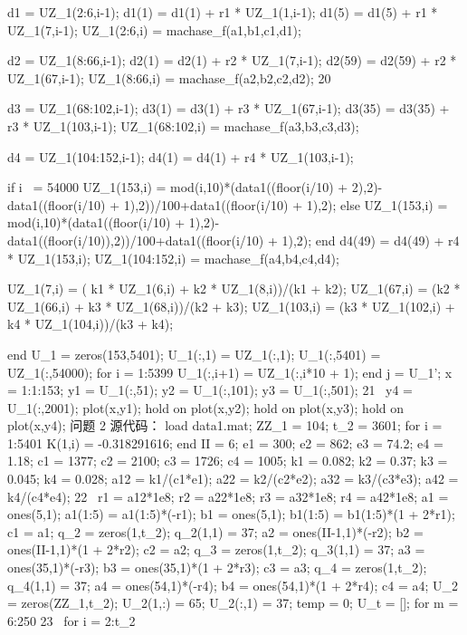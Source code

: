 \documentclass{article}
\begin{document}
	d1 = UZ_1(2:6,i-1); 
	d1(1) = d1(1) + r1 * UZ_1(1,i-1); 
	d1(5) = d1(5) + r1 * UZ_1(7,i-1); 
	UZ_1(2:6,i) = machase_f(a1,b1,c1,d1); 
	
	d2 = UZ_1(8:66,i-1); 
	d2(1) = d2(1) + r2 * UZ_1(7,i-1); 
	d2(59) = d2(59) + r2 * UZ_1(67,i-1); 
	UZ_1(8:66,i) = machase_f(a2,b2,c2,d2); 
	20 
	
	d3 = UZ_1(68:102,i-1); 
	d3(1) = d3(1) + r3 * UZ_1(67,i-1); 
	d3(35) = d3(35) + r3 * UZ_1(103,i-1); 
	UZ_1(68:102,i) = machase_f(a3,b3,c3,d3); 
	
	d4 = UZ_1(104:152,i-1); 
	d4(1) = d4(1) + r4 * UZ_1(103,i-1); 
	
	if i ~= 54000 
	UZ_1(153,i) = mod(i,10)*(data1((floor(i/10) + 2),2)-
	data1((floor(i/10) + 1),2))/100+data1((floor(i/10) + 1),2); 
	else 
	UZ_1(153,i) = mod(i,10)*(data1((floor(i/10) + 1),2)-
	data1((floor(i/10)),2))/100+data1((floor(i/10) + 1),2); 
	end 
	d4(49) = d4(49) + r4 * UZ_1(153,i); 
	UZ_1(104:152,i) = machase_f(a4,b4,c4,d4); 
	
	UZ_1(7,i) = ( k1 * UZ_1(6,i) + k2 * UZ_1(8,i))/(k1 + k2); 
	UZ_1(67,i) = (k2 * UZ_1(66,i) + k3 * UZ_1(68,i))/(k2 + k3); 
	UZ_1(103,i) = (k3 * UZ_1(102,i) + k4 * UZ_1(104,i))/(k3 + k4); 
	
	end 
	U_1 = zeros(153,5401); 
	U_1(:,1) = UZ_1(:,1); 
	U_1(:,5401) = UZ_1(:,54000); 
	for i = 1:5399 
	U_1(:,i+1) = UZ_1(:,i*10 + 1); 
	end 
	j = U_1'; 
	x = 1:1:153; 
	y1 = U_1(:,51); 
	y2 = U_1(:,101); 
	y3 = U_1(:,501); 
	21 
	y4 = U_1(:,2001); 
	plot(x,y1); 
	hold on 
	plot(x,y2); 
	hold on 
	plot(x,y3); 
	hold on 
	plot(x,y4); 
	问题 2 源代码： 
	load data1.mat; 
	ZZ_1 = 104; 
	t_2 = 3601; 
	for i = 1:5401 
	K(1,i) = -0.318291616; %
	end 
	II = 6; %
	e1 = 300; 
	e2 = 862; 
	e3 = 74.2; 
	e4 = 1.18; 
	c1 = 1377; 
	c2 = 2100; 
	c3 = 1726; 
	c4 = 1005; 
	k1 = 0.082; 
	k2 = 0.37; 
	k3 = 0.045; 
	k4 = 0.028; 
	a12 = k1/(c1*e1); 
	a22 = k2/(c2*e2); 
	a32 = k3/(c3*e3); 
	a42 = k4/(c4*e4); 
	22 
	r1 = a12*1e8; 
	r2 = a22*1e8; 
	r3 = a32*1e8; 
	r4 = a42*1e8; 
	a1 = ones(5,1); 
	a1(1:5) = a1(1:5)*(-r1); 
	b1 = ones(5,1); 
	b1(1:5) = b1(1:5)*(1 + 2*r1); 
	c1 = a1; 
	q_2 = zeros(1,t_2); 
	q_2(1,1) = 37; 
	a2 = ones(II-1,1)*(-r2); 
	b2 = ones(II-1,1)*(1 + 2*r2); 
	c2 = a2; 
	q_3 = zeros(1,t_2); 
	q_3(1,1) = 37; 
	a3 = ones(35,1)*(-r3); 
	b3 = ones(35,1)*(1 + 2*r3); 
	c3 = a3; 
	q_4 = zeros(1,t_2); 
	q_4(1,1) = 37; 
	a4 = ones(54,1)*(-r4); 
	b4 = ones(54,1)*(1 + 2*r4); 
	c4 = a4; 
	U_2 = zeros(ZZ_1,t_2); 
	U_2(1,:) = 65; %
	U_2(:,1) = 37; 
	temp = 0; 
	U_t = []; 
	for m = 6:250 
	23 
	for i = 2:t_2 
	
\end{document}

